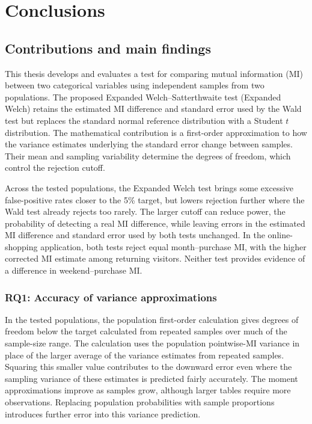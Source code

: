 \chapter{Conclusions}
\label{chap:conclusion}

\section{Contributions and main findings}

This thesis develops and evaluates a test for comparing mutual information
(MI) between two categorical variables using independent samples from two
populations. The proposed Expanded Welch--Satterthwaite test (Expanded
Welch) retains the estimated MI difference and standard error used by the
Wald test but replaces the standard normal reference distribution with a
Student \(t\) distribution. The mathematical contribution
is a first-order approximation to how the variance estimates underlying
the standard error change between samples. Their mean and sampling
variability determine the degrees of freedom, which control the rejection
cutoff.

Across the tested populations, the Expanded Welch test brings some excessive
false-positive rates closer to the 5\% target, but lowers rejection further
where the Wald test already rejects too rarely. The larger cutoff can reduce power,
the probability of detecting a real MI difference, while leaving errors in
the estimated MI difference and standard error used by both tests unchanged.
In the online-shopping application, both tests reject equal month--purchase
MI, with the higher corrected MI estimate among returning visitors. Neither
test provides evidence of a difference in weekend--purchase MI.

\subsection{RQ1: Accuracy of variance approximations}

In the tested populations, the population first-order calculation gives
degrees of freedom below the target calculated from repeated samples over
much of the sample-size range. The calculation uses the population
pointwise-MI variance in place of the larger average of the variance
estimates from repeated samples.
Squaring this smaller value contributes to the downward error even where
the sampling variance of these estimates is predicted fairly accurately.
The moment approximations improve as samples grow, although larger tables
require more observations.
Replacing population probabilities with sample
proportions introduces further error into this variance prediction.

